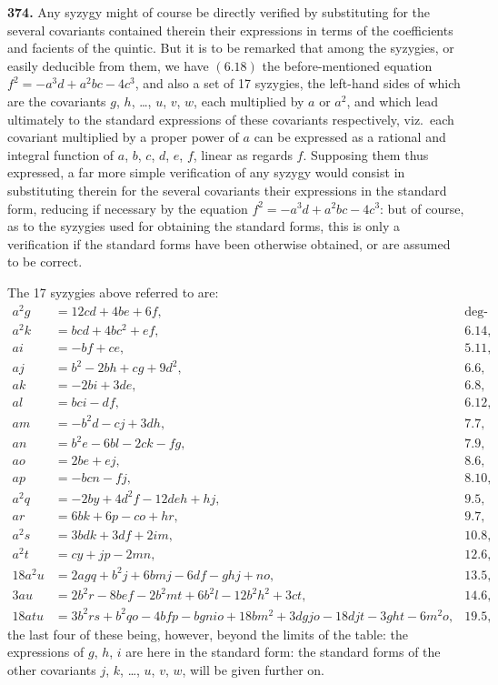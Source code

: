 \documentclass[12pt,a4paper]{article}
\begin{document}
\noindent\textbf{374.} Any syzygy might of course be directly verified by substituting for the several covariants contained therein their expressions in terms of the coefficients and facients of the quintic. But it is to be remarked that among the syzygies, or easily deducible from them, we have $(6.18)$ the before-mentioned equation $f^2 = -a^3 d + a^2 bc - 4c^3$, and also a set of 17 syzygies, the left-hand sides of which are the covariants $g$, $h$, \ldots, $u$, $v$, $w$, each multiplied by $a$ or $a^2$, and which lead ultimately to the standard expressions of these covariants respectively, viz.\ each covariant multiplied by a proper power of $a$ can be expressed as a rational and integral function of $a$, $b$, $c$, $d$, $e$, $f$, linear as regards $f$. Supposing them thus expressed, a far more simple verification of any syzygy would consist in substituting therein for the several covariants their expressions in the standard form, reducing if necessary by the equation $f^2 = -a^3 d + a^2 bc - 4c^3$: but of course, as to the syzygies used for obtaining the standard forms, this is only a verification if the standard forms have been otherwise obtained, or are assumed to be correct.

The 17 syzygies above referred to are:
\begin{align*}
a^2 g &= 12cd + 4be + 6f, & \text{deg-ord.\ 6.10,}\\
a^2 k &= bcd + 4bc^2 + ef, & \text{6.14,}\\
ai &= -bf + ce, & \text{5.11,}\\
aj &= b^2 - 2bh + cg + 9d^2, & \text{6.6,}\\
ak &= -2bi + 3de, & \text{6.8,}\\
al &=bci - df, & \text{6.12,}\\
am &= -b^2 d - cj + 3dh, & \text{7.7,}\\
an &= b^2 e - 6bl - 2ck - fg, & \text{7.9,}\\
ao &= 2be + ej, & \text{8.6,}\\
ap &= -bcn - fj, & \text{8.10,}\\
a^2 q &= -2by + 4d^2 f - 12deh + hj, & \text{9.5,}\\
ar &= 6bk + 6p - co + hr, & \text{9.7,}\\
a^2 s &= 3bdk + 3df + 2im, & \text{10.8,}\\
a^2 t &= cy + jp - 2mn, & \text{12.6,}\\
18a^2 u &= 2agq + b^2 j + 6bmj - 6df - ghj + no, & \text{13.5,}\\
3au &= 2b^2 r - 8bef - 2b^2 mt + 6b^2 l - 12b^2 h^2 + 3ct, & \text{14.6,}\\
18atu &= 3b^2 rs + b^2 qo - 4bfp - bgnio + 18bm^2 + 3dgjo - 18djt - 3ght - 6m^2 o, & \text{19.5,}
\end{align*}
the last four of these being, however, beyond the limits of the table: the expressions of $g$, $h$, $i$ are here in the standard form: the standard forms of the other covariants $j$, $k$, \ldots, $u$, $v$, $w$, will be given further on.
\end{document}
